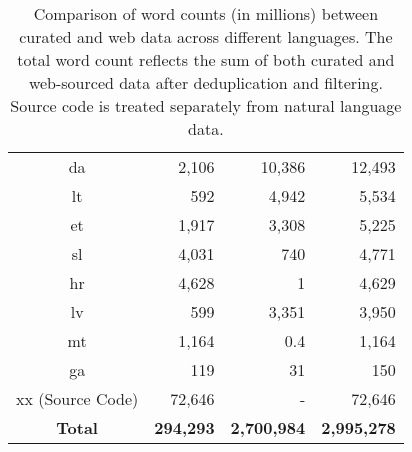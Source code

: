 \begin{table}[htb]
\begin{tabular}{crrr}
da                & 2,106                  & 10,386                 & 12,493                      \\
lt                & 592                    & 4,942                  & 5,534                        \\
et                & 1,917                  & 3,308                  & 5,225                        \\
sl                & 4,031                  & 740                    & 4,771                         \\
hr                & 4,628                  & 1                      & 4,629                      \\
lv                & 599                    & 3,351                  & 3,950                        \\
mt                & 1,164                  & 0.4                  & 1,164                    \\
ga                & 119                    & 31                     & 150                        \\ \hline
xx (Source Code)              & 72,646                 & -                      & 72,646                         \\ \hline
\textbf{Total}             & \textbf{294,293}       & \textbf{2,700,984}     & \textbf{2,995,278}                 \\ \hline
\end{tabular}
\caption{\label{tab:combined_words}%
Comparison of word counts (in millions) between curated and web data across different languages. The total word count reflects the sum of both curated and web-sourced data after deduplication and filtering. Source code is treated separately from natural language data.}
\end{table}